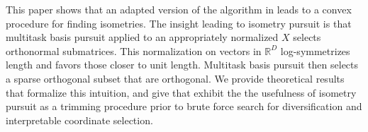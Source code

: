 This paper shows that an adapted version of the algorithm in \citet{Koelle2024-no} leads to a convex procedure for finding isometries.
The insight leading to isometry pursuit is that multitask basis pursuit applied to an appropriately normalized $ X$ selects orthonormal submatrices.
This normalization on vectors in $\mathbb R^D$ log-symmetrizes length and favors those closer to unit length.
Multitask basis pursuit then selects a sparse orthogonal subset that are orthogonal.
We provide theoretical results that formalize this intuition, and give that exhibit the the usefulness of isometry pursuit as a trimming procedure prior to brute force search for diversification and interpretable coordinate selection.

